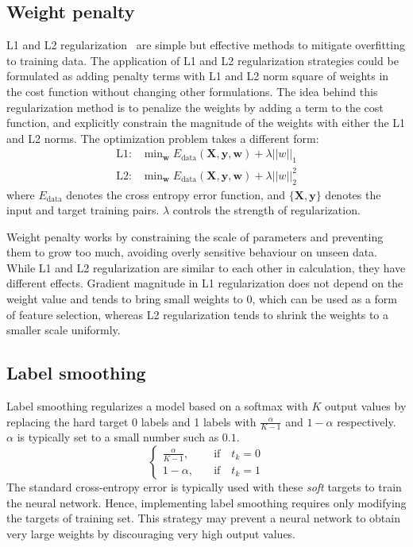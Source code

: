 \documentclass{article}
\begin{document}
\subsection{Weight penalty}

L1 and L2 regularization~\cite{ng2004feature} are simple but effective methods to mitigate overfitting to training data. 
The application of L1 and L2 regularization strategies could be formulated as adding penalty terms with L1 and L2 norm square of weights in the cost function without changing other formulations. 
The idea behind this regularization method is to penalize the weights by adding a term to the cost function, and explicitly constrain the magnitude of the weights with either the L1 and L2 norms.
The optimization problem takes a different form:
\begin{align}
    \text{L1: } & \text{min}_{\bm{w}} \; E_{\text{data}}(\bm{X}, \bm{y}, \bm{w}) + \lambda ||w||_1\\
    \text{L2: } & \text{min}_{\bm{w}} \; E_{\text{data}}(\bm{X}, \bm{y}, \bm{w}) + \lambda ||w||^2_2
\end{align}
where $E_{\text{data}}$ denotes the cross entropy error function, and $\{\bm{X}, \bm{y}\}$ denotes the input and target training pairs. 
$\lambda$ controls the strength of regularization.

Weight penalty works by constraining the scale of parameters and preventing them to grow too much, avoiding overly sensitive behaviour on unseen data.
While L1 and L2 regularization are similar to each other in calculation, they have different effects.
Gradient magnitude in L1 regularization does not depend on the weight value and tends to bring small weights to 0, which can be used as a form of feature selection, whereas L2 regularization tends to shrink the weights to a smaller scale uniformly. 


\subsection{Label smoothing}
Label smoothing regularizes a model based on a softmax with $K$ output values by replacing the hard target 0 labels and 1 labels with $\frac{\alpha}{K-1}$ and $1-\alpha$ respectively. 
$\alpha$ is typically set to a small number such as $0.1$.
\begin{equation}
    \begin{cases}
        \frac{\alpha}{K-1}, & \quad \text{if} \quad t_k=0\\
        1 - \alpha, & \quad \text{if} \quad t_k=1
    \end{cases}    
\end{equation}
The standard cross-entropy error is typically used with these \emph{soft} targets to train the neural network. 
Hence, implementing label smoothing requires only modifying the targets of training set.
This strategy may prevent a neural network to obtain very large weights by discouraging very high output values.
\end{document}
